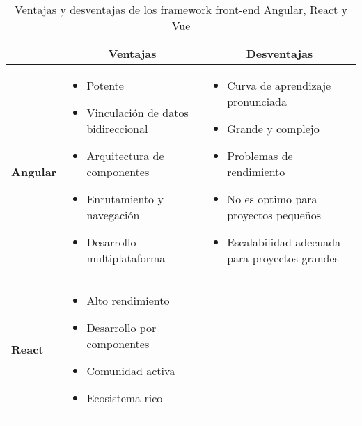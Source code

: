 \begin{footnotesize}
\begin{spacing}{1}
    \begin{center}
        \renewcommand*{\arraystretch}{1.4}
        \begin{longtable}[c]{ |>{\bfseries}p{} |p{} |p{}|    }
            \caption[Ventajas y desventajas de los framework front-end Angular, React y Vue]{ Ventajas y desventajas de los framework front-end Angular, React y Vue\cite{wu_desarrollo_2014} }\label{tab:table_angular_react_vue_ventajas_desventajas} \\
            \hline
            \multicolumn{1}{|c|}{ \textbf{Framework}} & \multicolumn{1}{c|}{\textbf{Ventajas}} & \multicolumn{1}{c|}{ \textbf{Desventajas}} \\
            \hline
            Angular & \begin{itemize}
                          \item Potente
                          \item Vinculación de datos bidireccional
                          \item Arquitectura de componentes
                          \item Enrutamiento y navegación
                          \item Desarrollo multiplataforma
            \end{itemize}
            & \begin{itemize}
                  \item Curva de aprendizaje pronunciada
                  \item Grande y complejo
                  \item Problemas de rendimiento
                  \item No es optimo para proyectos pequeños
                  \item Escalabilidad adecuada para proyectos grandes
            \end{itemize} \\
            \hline
            React & \begin{itemize}
                        \item Alto rendimiento
                        \item Desarrollo por componentes
                        \item Comunidad activa
                        \item Ecosistema rico

\end{itemize}
\end{longtable}
\end{center}
\end{spacing}
\end{footnotesize}
